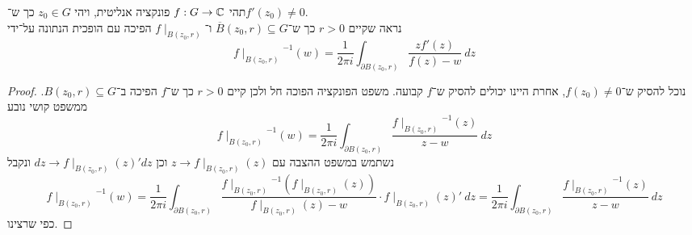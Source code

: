 \question{}
תהי $f : G \to \mathbb{C}$ פונקציה אנליטית, ויהי $z_0 \in G$ כך ש־$f'(z_0) \ne 0$. \\
נראה שקיים $r > 0$ כך ש־$\overline{B}(z_0, r) \subseteq G$ ו־$f \mid_{B(z_0, r)}$ הפיכה עם הופכית הנתונה על־ידי
\[
	{f \mid_{B(z_0, r)}}^{-1}(w)
	= \frac{1}{2\pi i} \int_{\partial B(z_0, r)} \frac{z f'(z)}{f(z) - w}\ dz
\]
\begin{proof}
	נוכל להסיק ש־$f(z_0) \ne 0$, אחרת היינו יכולים להסיק ש־$f$ קבועה.
	משפט הפונקציה הפוכה חל ולכן קיים $r > 0$ כך ש־$f$ הפיכה ב־$B(z_0, r) \subseteq G$.
	ממשפט קושי נובע
	\[
		{f \mid_{B(z_0, r)}}^{-1}(w)
		= \frac{1}{2\pi i} \int_{\partial B(z_0, r)} \frac{{f \mid_{B(z_0, r)}}^{-1}(z)}{z - w}\ dz
	\]
	נשתמש במשפט ההצבה עם $z \rightarrow f \mid_{B(z_0, r)}(z)$ וכן $dz \rightarrow f \mid_{B(z_0, r)}(z)' dz$ ונקבל
	\[
		{f \mid_{B(z_0, r)}}^{-1}(w)
		= \frac{1}{2\pi i} \int_{\partial B(z_0, r)} \frac{{f \mid_{B(z_0, r)}}^{-1}(f \mid_{B(z_0, r)}(z))}{f \mid_{B(z_0, r)}(z) - w} \cdot f \mid_{B(z_0, r)}(z)'\ dz
		= \frac{1}{2\pi i} \int_{\partial B(z_0, r)} \frac{{f \mid_{B(z_0, r)}}^{-1}(z)}{z - w}\ dz
	\]
	כפי שרצינו.
\end{proof}

